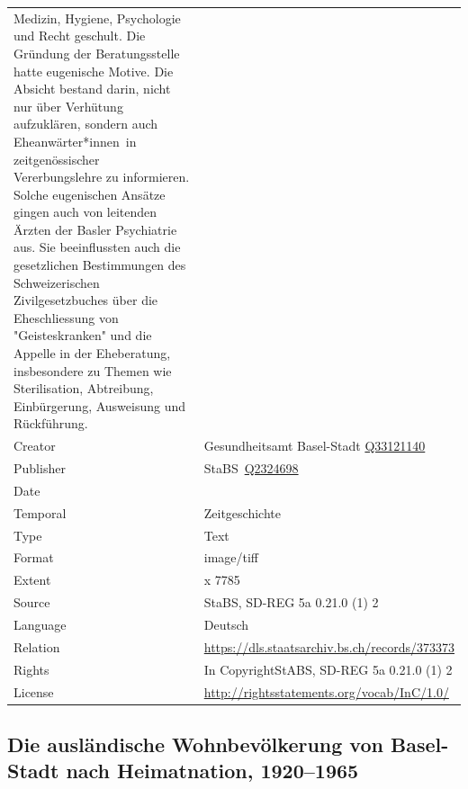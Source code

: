 \documentclass[
  letterpaper,
  DIV=11,
  numbers=noendperiod]{scrartcl}
\begin{document}
\begin{longtable}[]{@{}
  >{\raggedright\arraybackslash}p{}
  >{\raggedright\arraybackslash}p{}@{}}
Medizin, Hygiene, Psychologie und Recht geschult. Die Gründung der
Beratungsstelle hatte eugenische Motive. Die Absicht bestand darin,
nicht nur über Verhütung aufzuklären, sondern auch Eheanwärter*innen~in
zeitgenössischer Vererbungslehre zu informieren. Solche eugenischen
Ansätze gingen auch von leitenden Ärzten der Basler Psychiatrie aus. Sie
beeinflussten auch die gesetzlichen Bestimmungen des Schweizerischen
Zivilgesetzbuches über die Eheschliessung von "Geisteskranken" und die
Appelle in der Eheberatung, insbesondere zu Themen wie Sterilisation,
Abtreibung, Einbürgerung, Ausweisung und Rückführung. \\
Creator & Gesundheitsamt Basel-Stadt
\href{https://www.wikidata.org/wiki/Q33121140}{Q33121140} \\
Publisher &
StaBS~\href{https://www.wikidata.org/wiki/Q2324698}{Q2324698} \\
Date & 1955 \\
Temporal & Zeitgeschichte \\
Type & Text \\
Format & image/tiff \\
Extent & 7508 x 7785 \\
Source & StaBS, SD-REG 5a 0.21.0 (1) 2 \\
Language & Deutsch \\
Relation & \url{https://dls.staatsarchiv.bs.ch/records/373373} \\
Rights & In CopyrightStABS, SD-REG 5a 0.21.0 (1) 2 \\
License & \url{http://rightsstatements.org/vocab/InC/1.0/} \\
\end{longtable}

\subsection{Die ausländische Wohnbevölkerung von Basel-Stadt nach
Heimatnation,
1920--1965}\label{die-ausluxe4ndische-wohnbevuxf6lkerung-von-basel-stadt-nach-heimatnation-19201965}
\end{document}
